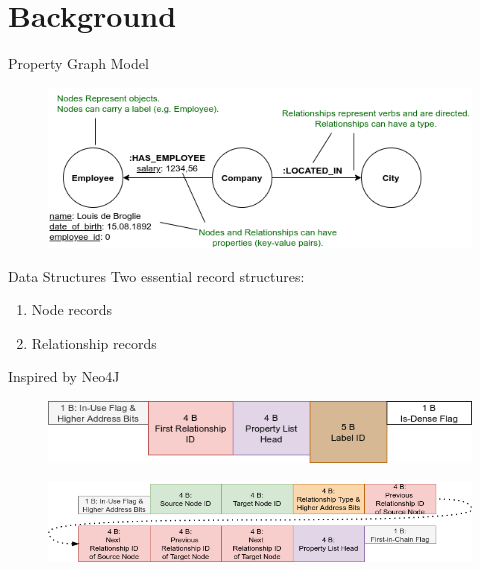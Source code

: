 \documentclass[rgb]{beamer}
\begin{document}
    \section{Background}
        \begin{frame}{Property Graph Model}
            \begin{figure}
                \begin{center}
                \includegraphics[keepaspectratio, height=0.8\textheight, width=.8\textwidth]{img/property_graph_elements.png}
                \end{center}
            \end{figure}
        \end{frame}
        
         \begin{frame}[allowframebreaks]{Data Structures}
            Two essential record structures: \\ [2em]
            \begin{enumerate}
            \item Node records \\ [2em]
            \item Relationship records \\ [3em]
            \end{enumerate}
            Inspired by Neo4J
            
            \framebreak
            \begin{figure}
                \begin{center}
                \includegraphics[keepaspectratio, height=\textheight, width=\textwidth]{img/node_record.png}
                \end{center}
            \end{figure}
            
            \framebreak
            \begin{figure}
                \begin{center}
                \includegraphics[keepaspectratio, height=\textheight, width=\textwidth]{img/relationship_record.png}
                \end{center}
            \end{figure}
        \end{frame}
        
\end{document}

